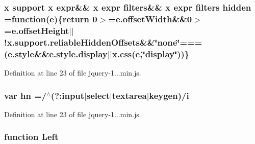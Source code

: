 \subsubsection[{hidden}]{ {\bf x} support {\bf x} expr\&\& {\bf x} expr filters\&\& {\bf x} expr filters hidden =function({\bf e})\{return 0$>$=e.\+offset\+Width\&\&0$>$=e.\+offset\+Height$\vert$$\vert$!x.\+support.\+reliable\+Hidden\+Offsets\&\&\char`\"{}none\char`\"{}===(e.\+style\&\&e.\+style.\+display$\vert$$\vert$x.\+css({\bf e},\char`\"{}display\char`\"{}))\}}\label{obj_2_release_2_package_2_package_tmp_2_scripts_2jquery-1_810_82_8min_8js_a086b6295ec8d15f090cd7239137a4979}


Definition at line 23 of file jquery-\/1...\+min.\+js.

\hypertarget{obj_2_release_2_package_2_package_tmp_2_scripts_2jquery-1_810_82_8min_8js_a703d7f6a2aadb540eb051a5f62674194}{}
\subsubsection[{hn}]{\setlength{\rightskip}{0pt plus 5cm}var hn =/$^\wedge$(?\+:{\bf input}$\vert$select$\vert$textarea$\vert$keygen)/{\bf i}}\label{obj_2_release_2_package_2_package_tmp_2_scripts_2jquery-1_810_82_8min_8js_a703d7f6a2aadb540eb051a5f62674194}


Definition at line 23 of file jquery-\/1...\+min.\+js.

\hypertarget{obj_2_release_2_package_2_package_tmp_2_scripts_2jquery-1_810_82_8min_8js_abef68bf244a1159a49fe3a2c153a65d2}{}
\subsubsection[{Left}]{\setlength{\rightskip}{0pt plus 5cm}function Left}\label{obj_2_release_2_package_2_package_tmp_2_scripts_2jquery-1_810_82_8min_8js_abef68bf244a1159a49fe3a2c153a65d2}


